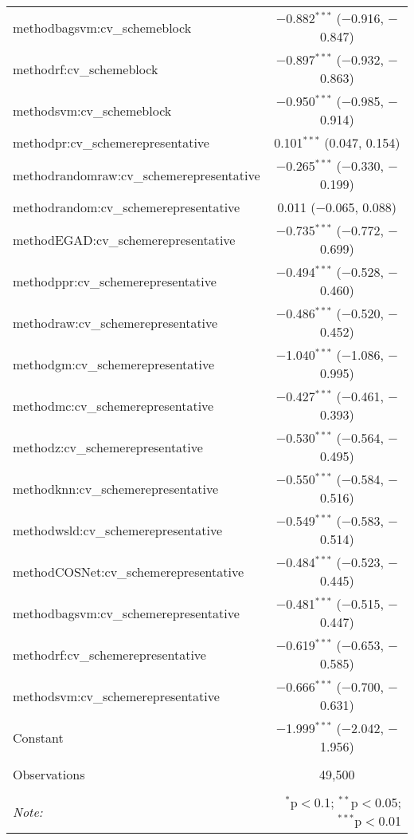 \begin{table}[!htbp]
\begin{tabular}{@{\extracolsep{5pt}}lc}
  methodbagsvm:cv\_schemeblock & $-$0.882$^{***}$ ($-$0.916, $-$0.847) \\ 
  methodrf:cv\_schemeblock & $-$0.897$^{***}$ ($-$0.932, $-$0.863) \\ 
  methodsvm:cv\_schemeblock & $-$0.950$^{***}$ ($-$0.985, $-$0.914) \\ 
  methodpr:cv\_schemerepresentative & 0.101$^{***}$ (0.047, 0.154) \\ 
  methodrandomraw:cv\_schemerepresentative & $-$0.265$^{***}$ ($-$0.330, $-$0.199) \\ 
  methodrandom:cv\_schemerepresentative & 0.011 ($-$0.065, 0.088) \\ 
  methodEGAD:cv\_schemerepresentative & $-$0.735$^{***}$ ($-$0.772, $-$0.699) \\ 
  methodppr:cv\_schemerepresentative & $-$0.494$^{***}$ ($-$0.528, $-$0.460) \\ 
  methodraw:cv\_schemerepresentative & $-$0.486$^{***}$ ($-$0.520, $-$0.452) \\ 
  methodgm:cv\_schemerepresentative & $-$1.040$^{***}$ ($-$1.086, $-$0.995) \\ 
  methodmc:cv\_schemerepresentative & $-$0.427$^{***}$ ($-$0.461, $-$0.393) \\ 
  methodz:cv\_schemerepresentative & $-$0.530$^{***}$ ($-$0.564, $-$0.495) \\ 
  methodknn:cv\_schemerepresentative & $-$0.550$^{***}$ ($-$0.584, $-$0.516) \\ 
  methodwsld:cv\_schemerepresentative & $-$0.549$^{***}$ ($-$0.583, $-$0.514) \\ 
  methodCOSNet:cv\_schemerepresentative & $-$0.484$^{***}$ ($-$0.523, $-$0.445) \\ 
  methodbagsvm:cv\_schemerepresentative & $-$0.481$^{***}$ ($-$0.515, $-$0.447) \\ 
  methodrf:cv\_schemerepresentative & $-$0.619$^{***}$ ($-$0.653, $-$0.585) \\ 
  methodsvm:cv\_schemerepresentative & $-$0.666$^{***}$ ($-$0.700, $-$0.631) \\ 
  Constant & $-$1.999$^{***}$ ($-$2.042, $-$1.956) \\ 
 \hline \\[-1.8ex] 
Observations & 49,500 \\ 
\hline 
\hline \\[-1.8ex] 
\textit{Note:}  & \multicolumn{1}{r}{$^{*}$p$<$0.1; $^{**}$p$<$0.05; $^{***}$p$<$0.01} \\ 
\end{tabular} 
\end{table} 
